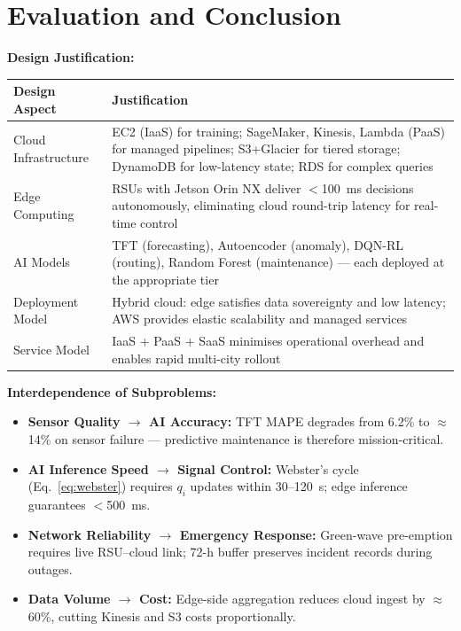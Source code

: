 \documentclass[11pt,a4paper]{article}
\begin{document}
\section{Evaluation and Conclusion}

\noindent\textbf{Design Justification:}

\renewcommand{\arraystretch}{1.25}
\begin{center}
\begin{tabular}{|L{3cm}|L{8.5cm}|}
\hline
\textbf{Design Aspect} & \textbf{Justification} \\
\hline
Cloud Infrastructure & EC2 (IaaS) for training; SageMaker, Kinesis, Lambda (PaaS) for managed pipelines; S3+Glacier for tiered storage; DynamoDB for low-latency state; RDS for complex queries \\
\hline
Edge Computing & RSUs with Jetson Orin NX deliver $<$100~ms decisions autonomously, eliminating cloud round-trip latency for real-time control \\
\hline
AI Models & TFT (forecasting), Autoencoder (anomaly), DQN-RL (routing), Random Forest (maintenance) — each deployed at the appropriate tier \\
\hline
Deployment Model & Hybrid cloud: edge satisfies data sovereignty and low latency; AWS provides elastic scalability and managed services \\
\hline
Service Model & IaaS + PaaS + SaaS minimises operational overhead and enables rapid multi-city rollout \\
\hline
\end{tabular}
\end{center}

\vspace{4pt}
\noindent\textbf{Interdependence of Subproblems:}

\begin{itemize}
  \item \textbf{Sensor Quality $\to$ AI Accuracy:} TFT MAPE degrades from 6.2\% to $\approx$14\% on sensor failure — predictive maintenance is therefore mission-critical.
  \item \textbf{AI Inference Speed $\to$ Signal Control:} Webster's cycle (Eq.~\ref{eq:webster}) requires $q_i$ updates within 30--120~s; edge inference guarantees $<$500~ms.
  \item \textbf{Network Reliability $\to$ Emergency Response:} Green-wave pre-emption requires live RSU--cloud link; 72-h buffer preserves incident records during outages.
  \item \textbf{Data Volume $\to$ Cost:} Edge-side aggregation reduces cloud ingest by $\approx$60\%, cutting Kinesis and S3 costs proportionally.
\end{itemize}
\end{document}
